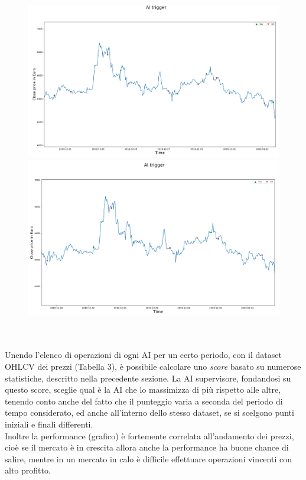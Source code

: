 \documentclass[a4paper,12pt]{report}
\begin{document}
\begin{fig}
	\\
	\begin{subfigure}{\linewidth}
		\includegraphics[width=\linewidth]{ai_trigger}
		\includegraphics[width=\linewidth]{ai_trigger2}
	\end{subfigure}
	\label{Figura 14}
\\~\\
Unendo l'elenco di operazioni di ogni AI per un certo periodo, con il dataset OHLCV dei prezzi (Tabella 3), è possibile calcolare uno \textit{score} basato su numerose statistiche, descritto nella precedente sezione. La AI supervisore, fondandosi su questo score, sceglie qual è la AI che lo massimizza di più rispetto alle altre, tenendo conto anche del fatto che il punteggio varia a seconda del periodo di tempo considerato, ed anche all'interno dello stesso dataset, se si scelgono punti iniziali e finali differenti.\\Inoltre la performance (grafico) è fortemente correlata all'andamento dei prezzi, cioè se il mercato è in crescita allora anche la performance ha buone chance di salire, mentre in un mercato in calo è difficile effettuare operazioni vincenti con alto profitto.\\

\end{fig}
\end{document}
